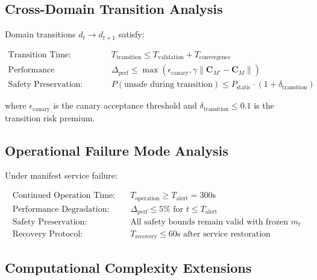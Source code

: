 \documentclass{article}
\begin{document}
\subsection{Cross-Domain Transition Analysis}

\begin{theorem}
\label{thm:domain_transition_extended}
Domain transitions $d_t \rightarrow d_{t+1}$ satisfy:

\begin{align}
\text{Transition Time:} \quad &T_{\text{transition}} \leq T_{\text{validation}} + T_{\text{convergence}} \\
\text{Performance Degradation:} \quad &\Delta_{\text{perf}} \leq \max(\epsilon_{\text{canary}}, \gamma\|\mathbf{C}_{M'} - \mathbf{C}_M\|) \\
\text{Safety Preservation:} \quad &P(\text{unsafe during transition}) \leq P_{\text{static}} \cdot (1 + \delta_{\text{transition}})
\end{align}

where $\epsilon_{\text{canary}}$ is the canary acceptance threshold and $\delta_{\text{transition}} \leq 0.1$ is the transition risk premium.
\end{theorem}

\subsection{Operational Failure Mode Analysis}

\begin{corollary}
\label{cor:graceful_degradation_extended}
Under manifest service failure:

\begin{align}
\text{Continued Operation Time:} \quad &T_{\text{operation}} \geq T_{\text{alert}} = 300\text{s} \\
\text{Performance Degradation:} \quad &\Delta_{\text{perf}} \leq 5\% \text{ for } t \leq T_{\text{alert}} \\
\text{Safety Preservation:} \quad &\text{All safety bounds remain valid with frozen } m_t \\
\text{Recovery Protocol:} \quad &T_{\text{recovery}} \leq 60\text{s after service restoration}
\end{align}
\end{corollary}

\subsection{Computational Complexity Extensions}
\end{document}
